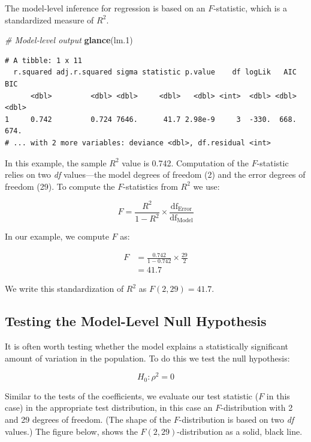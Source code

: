 \documentclass[]{book}
\newenvironment{Shaded}{\begin{snugshade}}{\end{snugshade}}
\newcommand{\CommentTok}[1]{\textcolor[rgb]{0.56,0.35,0.01}{\textit{#1}}}
\newcommand{\FloatTok}[1]{\textcolor[rgb]{0.00,0.00,0.81}{#1}}
\newcommand{\KeywordTok}[1]{\textcolor[rgb]{0.13,0.29,0.53}{\textbf{#1}}}
\newcommand{\NormalTok}[1]{#1}
\begin{document}
The model-level inference for regression is based on an \(F\)-statistic, which is a standardized measure of \(R^2\).

\begin{Shaded}
\begin{Highlighting}[]
\CommentTok{# Model-level output}
\KeywordTok{glance}\NormalTok{(lm}\FloatTok{.1}\NormalTok{)}
\end{Highlighting}
\end{Shaded}

\begin{verbatim}
# A tibble: 1 x 11
  r.squared adj.r.squared sigma statistic p.value    df logLik   AIC   BIC
      <dbl>         <dbl> <dbl>     <dbl>   <dbl> <int>  <dbl> <dbl> <dbl>
1     0.742         0.724 7646.      41.7 2.98e-9     3  -330.  668.  674.
# ... with 2 more variables: deviance <dbl>, df.residual <int>
\end{verbatim}

In this example, the sample \(R^2\) value is 0.742. Computation of the \(F\)-statistic relies on two \emph{df} values---the model degrees of freedom (2) and the error degrees of freedom (29). To compute the \(F\)-statistics from \(R^2\) we use:

\[
F = \frac{R^2}{1-R^2} \times \frac{\mathrm{df}_{\mathrm{Error}}}{\mathrm{df}_{\mathrm{Model}}}
\]

In our example, we compute \(F\) as:

\[
\begin{split}
F &= \frac{0.742}{1-0.742} \times \frac{29}{2} \\
&= 41.7
\end{split}
\]

We write this standardization of \(R^2\) as \(F(2,29)=41.7\).

\hypertarget{testing-the-model-level-null-hypothesis}{%
\subsection{Testing the Model-Level Null Hypothesis}\label{testing-the-model-level-null-hypothesis}}

It is often worth testing whether the model explains a statistically significant amount of variation in the population. To do this we test the null hypothesis:

\[
H_0:\rho^2 = 0
\]

Similar to the tests of the coefficients, we evaluate our test statistic (\(F\) in this case) in the appropriate test distribution, in this case an \(F\)-distribution with 2 and 29 degrees of freedom. (The shape of the \(F\)-distribution is based on two \emph{df} values.) The figure below, shows the \(F(2,29)\)-distribution as a solid, black line.
\end{document}

